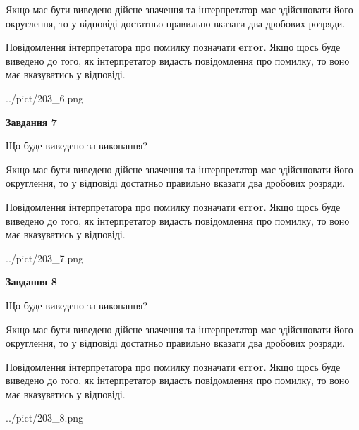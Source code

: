 \documentclass[12pt, ukrainian]{article}
\begin{document}
{\begin {Large}
Якщо має бути виведено дійсне значення та інтерпретатор має здійснювати його округлення, 
то у відповіді достатньо правильно вказати два дробових розряди.

Повідомлення інтерпретатора про помилку позначати \textbf{error}.
Якщо щось буде виведено до того, як інтерпретатор видасть повідомлення про помилку, 
то воно має вказуватись у відповіді. \par

\begin{center}
	{../pict/203_6.png}
\end{center}
\newpage

{\begin {center}\textbf{Завдання 7}\end {center}}\par
Що буде виведено за виконання? \par

Якщо має бути виведено дійсне значення та інтерпретатор має здійснювати його округлення, 
то у відповіді достатньо правильно вказати два дробових розряди.

Повідомлення інтерпретатора про помилку позначати \textbf{error}.
Якщо щось буде виведено до того, як інтерпретатор видасть повідомлення про помилку, 
то воно має вказуватись у відповіді. \par

\begin{center}
	{../pict/203_7.png}
\end{center}
\newpage

{\begin {center}\textbf{Завдання 8}\end {center}}\par
Що буде виведено за виконання? \par

Якщо має бути виведено дійсне значення та інтерпретатор має здійснювати його округлення, 
то у відповіді достатньо правильно вказати два дробових розряди.

Повідомлення інтерпретатора про помилку позначати \textbf{error}.
Якщо щось буде виведено до того, як інтерпретатор видасть повідомлення про помилку, 
то воно має вказуватись у відповіді. \par

\begin{center}
	{../pict/203_8.png}
\end{center}
\newpage


\end{Large}}
\end{document}
